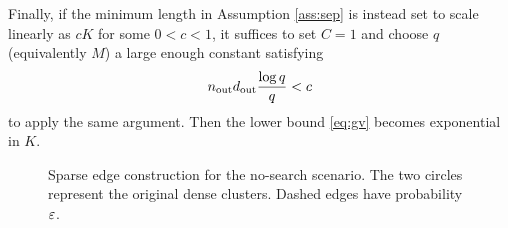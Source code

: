 Finally, if the minimum length in Assumption \ref{ass:sep} is instead set to scale linearly as $cK$ for some $0<c<1$, it suffices to set $C=1$ and choose $q$ (equivalently $M$) a large enough constant satisfying
\begin{equation*}
n_{\operatorname{out}}d_{\operatorname{out}} \frac{\log q}{q} < c
\end{equation*}
to apply the same argument. Then the lower bound \eqref{eq:gv} becomes exponential in $K$.


\begin{figure}[t]
\centering
{}
\caption{Sparse edge construction for the no-search scenario. The two circles represent the original dense clusters. Dashed edges have probability $\varepsilon$.}
\label{fig1}
\end{figure}


